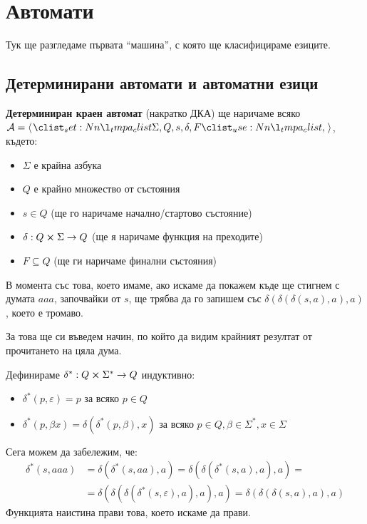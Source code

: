 \chapter{Автомати}

Тук ще разгледаме първата ``машина'', с която ще класифицираме езиците.

\section{Детерминирани автомати и автоматни езици}

\begin{definition}
    \textbf{Детерминиран краен автомат} (накратко ДКА) ще наричаме всяко $\mathcal{A} = \opair{\Sigma, Q, s, \delta, F}$, където:
    \begin{itemize}
        \item $\Sigma$ е крайна азбука
        \item $Q$ е крайно множество от състояния
        \item $s \in Q$ (ще го наричаме начално/стартово състояние)
        \item $\delta : Q \cross \Sigma \rightarrow Q$ (ще я наричаме функция на преходите)
        \item $F \subseteq Q$ (ще ги наричаме финални състояния)
    \end{itemize}
\end{definition}

В момента със това, което имаме,
ако искаме да покажем къде ще стигнем с думата $aaa$, започвайки от $s$,
ще трябва да го запишем със $\delta(\delta(\delta(s, a), a), a)$, което е тромаво.

За това ще си въведем начин, по който да видим крайният резултат от прочитането на цяла дума.

\begin{definition}
    Дефинираме $\delta^* : Q \cross \Sigma^* \rightarrow Q$ индуктивно:
    \begin{itemize}
        \item $\delta^*(p, \varepsilon) = p$ за всяко $p \in Q$
        \item $\delta^*(p, \beta x) = \delta(\delta^*(p, \beta), x)$ за всяко $p \in Q, \beta \in \Sigma^*, x \in \Sigma$
    \end{itemize}
\end{definition}

Сега можем да забележим, че:
\begin{align*}
    \delta^*(s, aaa) & = \delta(\delta^*(s, aa), a) = \delta(\delta(\delta^*(s, a), a), a) =                           \\
                     & = \delta(\delta(\delta(\delta^*(s, \varepsilon), a), a), a) =\delta(\delta(\delta(s, a), a), a)
\end{align*}
Функцията наистина прави това, което искаме да прави.

